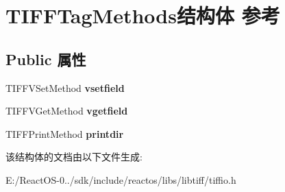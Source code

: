 \hypertarget{struct_t_i_f_f_tag_methods}{}\section{T\+I\+F\+F\+Tag\+Methods结构体 参考}
\label{struct_t_i_f_f_tag_methods}
\subsection*{Public 属性}
\begin{DoxyCompactItemize}
\item 
\mbox{\label{struct_t_i_f_f_tag_methods_aca00dcd89d84dee403aaf8a7251285e2}} 
T\+I\+F\+F\+V\+Set\+Method {\bfseries vsetfield}
\item 
\mbox{\label{struct_t_i_f_f_tag_methods_a3707570a5c481344ad28313216451766}} 
T\+I\+F\+F\+V\+Get\+Method {\bfseries vgetfield}
\item 
\mbox{\label{struct_t_i_f_f_tag_methods_ae41b0cc9ff7ba54ba2f3b57a77d2bac2}} 
T\+I\+F\+F\+Print\+Method {\bfseries printdir}
\end{DoxyCompactItemize}


该结构体的文档由以下文件生成\+:\begin{DoxyCompactItemize}
\item 
E\+:/\+React\+O\+S-\/0../sdk/include/reactos/libs/libtiff/tiffio.\+h\end{DoxyCompactItemize}
